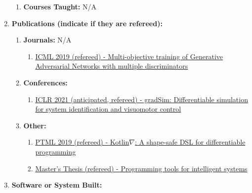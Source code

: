 \documentclass[11pt]{article}
\begin{document}
\begin{enumerate}
\begin{enumerate}
            \item \textbf{Courses Taught:} N/A

        \end{enumerate}

        \item \textbf{Publications (indicate if they are refereed):}
        \begin{enumerate}
            \item \textbf{Journals:} N/A
            \begin{enumerate}
            \item \href{http://proceedings.mlr.press/v97/albuquerque19a/albuquerque19a.pdf}{ICML 2019 (refereed) - Multi-objective training of Generative Adversarial Networks with multiple discriminators}
            \end{enumerate}
            \item \textbf{Conferences:}
            \begin{enumerate}
            \item \href{https://openreview.net/forum?id=c_E8kFWfhp0}{ICLR 2021 (anticipated, refereed) - gradSim: Differentiable simulation for system identification and visuomotor control}
            \end{enumerate}

            \item \textbf{Other:}
            \begin{enumerate}
                \item \href{https://openreview.net/forum?id=SkluMSZ08H}{PTML 2019 (refereed) - Kotlin$\nabla$: A shape-safe DSL for differentiable programming}
                \item \href{http://breandan.net/public/masters_thesis.pdf}{Master's Thesis (refereed) - Programming tools for intelligent systems}
            \end{enumerate}

        \end{enumerate}

        \item \textbf{Software or System Built:}


\end{enumerate}
\end{document}

